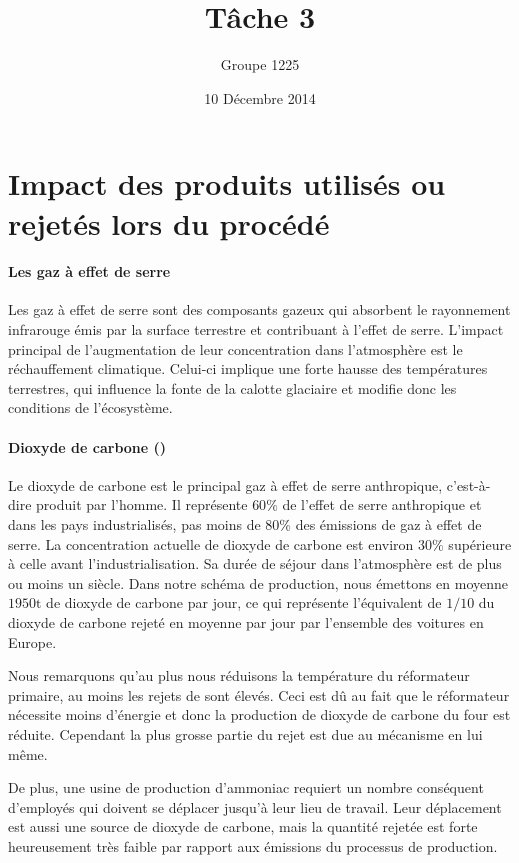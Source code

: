 \documentclass[a4paper, oneside, 12pt]{article}
\title{Tâche 3}
\author{Groupe 1225}
\date{10 Décembre 2014}
\begin{document}
\maketitle

\section{Impact des produits utilisés ou rejetés lors du procédé}

\paragraph{Les gaz à effet de serre} 

Les gaz à effet de serre sont des composants gazeux qui absorbent le rayonnement infrarouge
émis par la surface terrestre et contribuant à l’effet de serre. 
L’impact principal de l’augmentation de leur concentration 
dans l’atmosphère est le réchauffement climatique. 
Celui-ci implique une forte hausse des températures terrestres, 
qui influence la fonte de la calotte glaciaire 
et modifie donc les conditions de l’écosystème.

\paragraph{Dioxyde de carbone ()}

Le dioxyde de carbone est le principal gaz à effet de serre anthropique, 
c’est-à-dire produit par l’homme. 
Il représente $60\%$ de l’effet de serre anthropique et dans les pays industrialisés, 
pas moins de $80\%$ des émissions de gaz à effet de serre. 
La concentration actuelle de dioxyde de carbone 
est environ $30\%$ supérieure à celle avant l’industrialisation. 
Sa durée de séjour dans l’atmosphère est de plus ou moins un siècle. 
Dans notre schéma de production, nous émettons en moyenne $1950\si{\tonne}$ 
de dioxyde de carbone par jour, 
ce qui représente l’équivalent de $1/10$ du dioxyde de carbone rejeté 
en moyenne par jour par l’ensemble des voitures en Europe.

Nous remarquons qu’au plus nous réduisons la température du réformateur primaire, 
au moins les rejets de  sont élevés. 
Ceci est dû au fait que le réformateur nécessite moins d’énergie
et donc la production de dioxyde de carbone du four est réduite. 
Cependant la plus grosse partie du rejet est due au mécanisme en lui même. 

De plus, une usine de production d’ammoniac requiert un nombre conséquent d’employés 
qui doivent se déplacer jusqu’à leur lieu de travail. 
Leur déplacement est aussi une source de dioxyde de carbone, 
mais la quantité rejetée est forte heureusement très faible 
par rapport aux émissions du processus de production.
\end{document}
